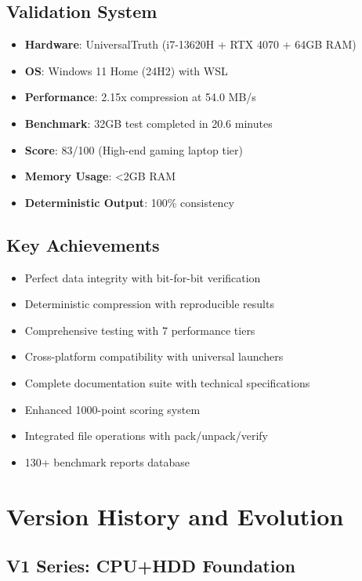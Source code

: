 \documentclass[12pt,a4paper]{article}
\begin{document}
\subsection{Validation System}

\begin{itemize}
    \item \textbf{Hardware}: UniversalTruth (i7-13620H + RTX 4070 + 64GB RAM)
    \item \textbf{OS}: Windows 11 Home (24H2) with WSL
    \item \textbf{Performance}: 2.15x compression at 54.0 MB/s
    \item \textbf{Benchmark}: 32GB test completed in 20.6 minutes
    \item \textbf{Score}: 83/100 (High-end gaming laptop tier)
    \item \textbf{Memory Usage}: <2GB RAM
    \item \textbf{Deterministic Output}: 100\% consistency
\end{itemize}

\subsection{Key Achievements}
\begin{itemize}
    \item Perfect data integrity with bit-for-bit verification
    \item Deterministic compression with reproducible results
    \item Comprehensive testing with 7 performance tiers
    \item Cross-platform compatibility with universal launchers
    \item Complete documentation suite with technical specifications
    \item Enhanced 1000-point scoring system
    \item Integrated file operations with pack/unpack/verify
    \item 130+ benchmark reports database
\end{itemize}

\newpage

\section{Version History and Evolution}

\subsection{V1 Series: CPU+HDD Foundation}
\end{document}
